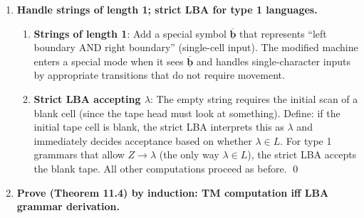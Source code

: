 \begin{enumerate}[{11.}1. ]
\begin{enumerate}
\item \textbf{New transitions}: For any old transition $\delta(s,a) = (s',a',d)$ in $M$:
  - The new TM reads the three-track symbol at the current head position.
  - It writes the new three-track symbol (updating track 1, preserving tracks 2 and 3).
  - If the head would move left from the leftmost cell (track 2 = $L$) or right from the rightmost (track 3 = $R$), the new TM instead enters a unique ``boundary error'' state and rejects.
  - This ensures the head never leaves the input region.

\item \textbf{Proof of equivalence} (for $|x|\geq 2$): By induction on the number of steps:
  - The strict LBA $M'$ exactly simulates $M$ as long as the head stays within boundaries.
  - Since $M$ is a linear bounded automaton, it never leaves the input region (this is the definition of LBA).
  - Therefore the boundary checks never trigger, and $M'$ accepts exactly when $M$ does. \qed
\end{enumerate}

\item \textbf{Handle strings of length 1; strict LBA for type 1 languages.}

\begin{enumerate}
\item \textbf{Strings of length 1}: Add a special symbol $\overline{\underline{\pmb{b}}}$ that represents ``left boundary AND right boundary'' (single-cell input). The modified machine enters a special mode when it sees $\overline{\underline{\pmb{b}}}$ and handles single-character inputs by appropriate transitions that do not require movement.

\item \textbf{Strict LBA accepting $\lambda$}: The empty string requires the initial scan of a blank cell (since the tape head must look at something). Define: if the initial tape cell is blank, the strict LBA interprets this as $\lambda$ and immediately decides acceptance based on whether $\lambda\in L$. For type 1 grammars that allow $Z\to\lambda$ (the only way $\lambda\in L$), the strict LBA accepts the blank tape. All other computations proceed as before. \qed
\end{enumerate}

\item \textbf{Prove (Theorem 11.4) by induction: TM computation iff LBA grammar derivation.}


\end{enumerate}
